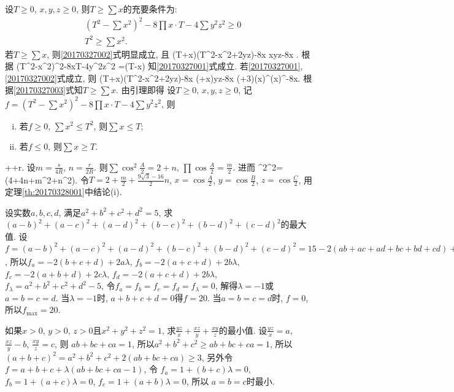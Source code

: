 \bl{}{}
设$T\ge0$, $x, y, z\ge0$, 则$T\ge\sum x$的充要条件为:
\begin{align}
 & (T^2-\sum x^2)^2-8\prod x\cdot T-4\sum y^2z^2\ge0\label{20170327001}\\
 & T^2\ge\sum x^2.\label{20170327002}
\end{align}
\el
\ba
若$T\ge\sum x$, 则\ref{20170327002}式明显成立, 且
\bee
(T+\sum x)(T^2-\sum x^2+2\sum yz)-8\prod x
\sum x\sum yz-8\prod x
.
\eee
根据
\be
(T^2-\sum x^2)^2-8\prod x\cdot T-4\sum y^2z^2
=(T-\sum x)\label{20170327003}
\ee
知\ref{20170327001}式成立. 若\ref{20170327001}, \ref{20170327002}式成立, 则
\bee
(T+\sum x)(T^2-\sum x^2+2\sum yz)-8\prod x
\ge (+\sum x)\sum yz-8\prod x
\ge (+3)(\prod x)^{}(\prod x)^{}-8\prod x.
\eee
根据\ref{20170327003}式知$T\ge\sum x$.
\ea
由引理即得
设$T\ge0$, $x,y,z\ge0$, 记$f=(T^2-\sum x^2)^2-8\prod x\cdot T-4\sum y^2z^2$, 则
\begin{enumerate}[(i)]
 \item 若$f\ge0$, $\sum x^2\le T^2$, 则$\sum x\le T$;
 \item 若$f\le 0$, 则$\sum x\ge T$.
\end{enumerate}
\et

\bq{}{}
\bee
\sum\cos{}++r.
\eee
\eq
\ba
设$m=\frac{s}{4R}$, $n=\frac{r}{2R}$. 则$\sum\cos^2\frac{A}{2}=2+n$, $\prod\cos\frac{A}{2}=\frac{m}{2}$. 进而
\bee
\sum\cos^2\cos^2=(4+4n+m^2+n^2).
\eee
令$T=2+\frac{m}{2}+\frac{9\sqrt{3}-16}{2}n$, $x=\cos\frac{A}{2}$, $y=\cos\frac{B}{2}$, $z=\cos\frac{C}{2}$,
用定理\ref{th:20170328001}中结论(i).
\ea

\bq{}{}
设实数$a,b,c,d$, 满足$a^2+b^2+c^2+d^2=5$, 求$(a-b)^2+(a-c)^2+(a-d)^2+(b-c)^2+(b-d)^2+(c-d)^2$的最大值.
\eq
\ba
设$f=(a-b)^2+(a-c)^2+(a-d)^2+(b-c)^2+(b-d)^2+(c-d)^2=15-2(ab+ac+ad+bc+bd+cd)+\lambda(a^2+b^2+c^2+d^2-5)$,
所以$f_a=-2(b+c+d)+2a\lambda$, $f_b=-2(a+c+d)+2b\lambda$, $f_c=-2(a+b+d)+2c\lambda$, $f_d=-2(a+c+d)+2b\lambda$,
$f_{\lambda}=a^2+b^2+c^2+d^2-5$, 令$f_a=f_b=f_c=f_d=f_{\lambda}=0$, 解得$\lambda=-1$或$a=b=c=d$.
当$\lambda=-1$时, $a+b+c+d=0$得$f=20$.
当$a=b=c=d$时, $f=0$, 所以$f_{\max}=20$.
\ea

\bq{}{}
如果$x>0$, $y>0$, $z>0$且$x^2+y^2+z^2=1$, 求$\frac{yz}{x}+\frac{xz}{y}+\frac{xy}{z}$的最小值.
\eq
\ba
设$\frac{yz}{x}=a$, $\frac{xz}{y}-b$, $\frac{xy}{z}=c$, 则
$ab+bc+ca=1$, 所以$a^2+b^2+c^2\ge ab+bc+ca=1$, 所以$(a+b+c)^2=a^2+b^2+c^2+2(ab+bc+ca)\ge3$,
另外令$f=a+b+c+\lambda(ab+bc+ca-1)$, 令
$f_a=1+(b+c)\lambda=0$, $f_b=1+(a+c)\lambda=0$, $f_c=1+(a+b)\lambda=0$, 所以
$a=b=c$时最小.
\ea

